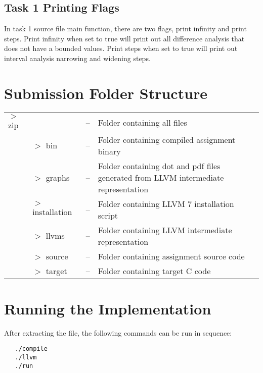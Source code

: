\documentclass[11pt,a4paper,fleqn]{article}
\begin{document}
\subsection {Task 1 Printing Flags}

In task 1 source file main function, there are two flags, print infinity and print steps.
Print infinity when set to true will print out all difference analysis that does not have a bounded values.
Print steps when set to true will print out interval analysis narrowing and widening steps.

\section{Submission Folder Structure}

\begin{tabularx}{\linewidth}{l l l X}
   $>$ zip &                  & -- & Folder containing all files                                                         \\
           & $>$ bin          & -- & Folder containing compiled assignment binary                                        \\
           & $>$ graphs       & -- & Folder containing dot and pdf files generated from LLVM intermediate representation \\
           & $>$ installation & -- & Folder containing LLVM 7 installation script                                        \\
           & $>$ llvms        & -- & Folder containing LLVM intermediate representation                                  \\
           & $>$ source       & -- & Folder containing assignment source code                                            \\
           & $>$ target       & -- & Folder containing target C code                                                     \\
\end{tabularx}

\section {Running the Implementation}

After extracting the file, the following commands can be run in sequence:

\begin{verbatim}
   ./compile
   ./llvm
   ./run
\end{verbatim}
\end{document}

